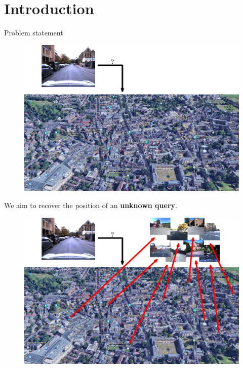 \section{Introduction}

\label{sec:intro}

\begin{frame}{Problem statement}
	\only<1>
	{
	\begin{minipage}{0.75\linewidth}
		\begin{figure}
			\includegraphics[width=\linewidth]{vect/intro/fig1/gif/1}
		\end{figure}		
	\end{minipage}
	\hfill
	\begin{minipage}{0.18\linewidth}
		We aim to recover the position of an \textbf{unknown query}.	
	\end{minipage}
	}
	{
	\begin{minipage}{0.75\linewidth}
		\begin{figure}
			\includegraphics[width=\linewidth]{vect/intro/fig1/gif/2}

\end{figure}
\end{minipage}}
\end{frame}
